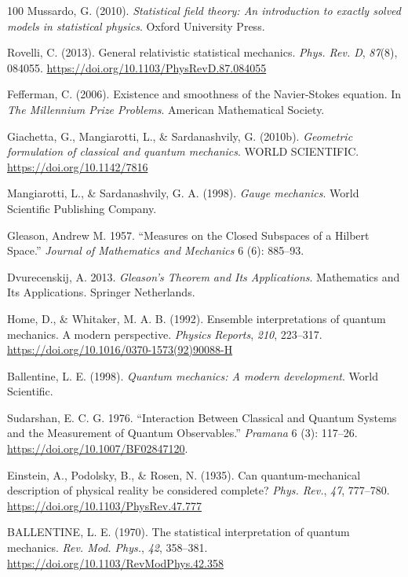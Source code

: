 \documentclass[11pt]{book}
\begin{document}
\begin{thebibliography}{100}
 Mussardo, G. (2010). \emph{Statistical field theory: An introduction to
exactly solved models in statistical physics}. Oxford University Press.

 Rovelli, C. (2013). General relativistic statistical mechanics.
\emph{Phys. Rev. D}, \emph{87}(8), 084055.
\url{https://doi.org/10.1103/PhysRevD.87.084055}

 Fefferman, C. (2006). Existence and smoothness of the Navier-Stokes
equation. In \emph{The Millennium Prize Problems}. American Mathematical
Society.

 Giachetta, G., Mangiarotti, L., \& Sardanashvily, G. (2010b).
\emph{Geometric formulation of classical and quantum mechanics}. WORLD
SCIENTIFIC. \url{https://doi.org/10.1142/7816}

 Mangiarotti, L., \& Sardanashvily, G. A. (1998). \emph{Gauge mechanics}.
World Scientific Publishing Company.

 Gleason, Andrew M. 1957. {``Measures on the Closed Subspaces of a
Hilbert Space.''} \emph{Journal of Mathematics and Mechanics} 6 (6):
885--93.

 Dvurecenskij, A. 2013. \emph{Gleason's Theorem and Its Applications}.
Mathematics and Its Applications. Springer Netherlands.

 Home, D., \& Whitaker, M. A. B. (1992). Ensemble interpretations of
quantum mechanics. A modern perspective. \emph{Physics Reports},
\emph{210}, 223--317. \url{https://doi.org/10.1016/0370-1573(92)90088-H}

 Ballentine, L. E. (1998). \emph{Quantum mechanics: A modern
development}. World Scientific.

 Sudarshan, E. C. G. 1976. {``Interaction Between Classical and Quantum
Systems and the Measurement of Quantum Observables.''} \emph{Pramana} 6
(3): 117--26. \url{https://doi.org/10.1007/BF02847120}.

 Einstein, A., Podolsky, B., \& Rosen, N. (1935). Can quantum-mechanical
description of physical reality be considered complete? \emph{Phys.
Rev.}, \emph{47}, 777--780. \url{https://doi.org/10.1103/PhysRev.47.777}

 BALLENTINE, L. E. (1970). The statistical interpretation of quantum
mechanics. \emph{Rev. Mod. Phys.}, \emph{42}, 358--381.
\url{https://doi.org/10.1103/RevModPhys.42.358}


\end{thebibliography}
\end{document}
